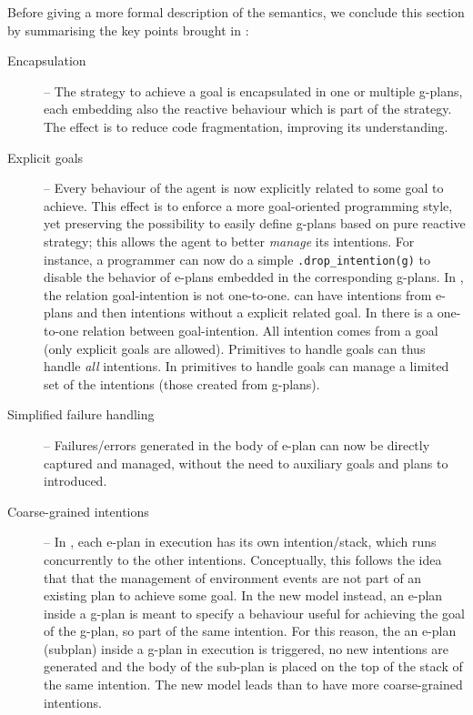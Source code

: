Before giving a more formal description of the semantics, we conclude this section by summarising the key points brought in {\aser}:
%
\begin{description}
%
\item[Encapsulation] -- The strategy to achieve a goal is encapsulated in one or multiple g-plans, each embedding also the reactive behaviour which is part of the strategy. 
%
The effect is to reduce code fragmentation, improving its understanding.
%
\item[Explicit goals] -- Every behaviour of the agent is now explicitly related to some goal to achieve.
%
This effect is to enforce a more goal-oriented programming style, yet preserving the possibility to easily define g-plans based on pure reactive strategy;
%
this allows the agent to better \emph{manage} its intentions. For instance, a programmer can now do a simple \texttt{.drop\_intention(g)} to disable the behavior of e-plans embedded in the corresponding g-plans. 
%
In {\asl}, the relation goal-intention is not one-to-one. {\asl} can have intentions from e-plans and then intentions without a explicit related goal. 
In {\aser} there is a one-to-one relation between goal-intention. 
%
All intention comes from a goal (only explicit goals are allowed). 
%
Primitives to handle goals can thus handle \emph{all} intentions. 
%
In {\asl} primitives to handle goals can manage a limited set of the intentions (those created from g-plans). 


\item[Simplified failure handling] -- Failures/errors generated in the  body of e-plan can now be directly captured and managed, without the need to auxiliary goals and plans to introduced.

\item[Coarse-grained intentions] -- In {\asl}, each e-plan in execution has its own intention/stack, which runs concurrently to the other intentions. Conceptually, this follows the idea that that the management of environment events are not part of an existing plan to achieve some goal.
%
In the new model instead, an e-plan inside a g-plan is meant to specify a behaviour useful for achieving the goal of the g-plan, so part of the same intention.
%
For this reason, the an e-plan (subplan) inside a g-plan in execution is triggered, no new intentions are generated and the body of the sub-plan is placed on the top of the stack of the same intention. 
%
The new model leads than to have more coarse-grained intentions.
%
%
\end{description}
